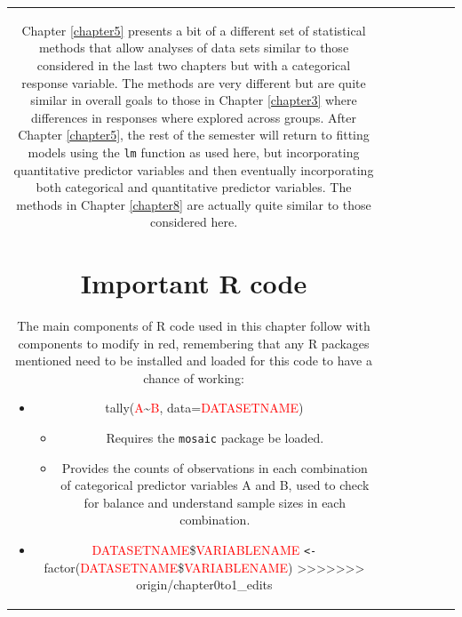 \documentclass[]{book}
\newenvironment{Shaded}{\begin{snugshade}}{\end{snugshade}}
\theoremstyle{definition}
\theoremstyle{definition}
\theoremstyle{remark}
\begin{document}
\begin{longtable}[]{@{}ccccccc@{}}
\begin{minipage}[b]{0.10\columnwidth}
\begin{Shaded}
\begin{Highlighting}[]
\begin{Shaded}
\begin{Highlighting}[]
\begin{Shaded}
\begin{Highlighting}[]
\begin{Shaded}
\begin{Highlighting}[]
\begin{Shaded}
\begin{Highlighting}[]
\begin{Shaded}
\begin{Highlighting}[]
\begin{Shaded}
\begin{Highlighting}[]
Chapter \ref{chapter5} presents a bit of a different set of statistical
methods that allow analyses of data sets similar to those considered in
the last two chapters but with a categorical response variable. The
methods are very different but are quite similar in overall goals to
those in Chapter \ref{chapter3} where differences in responses where
explored across groups. After Chapter \ref{chapter5}, the rest of the
semester will return to fitting models using the \texttt{lm} function as
used here, but incorporating quantitative predictor variables and then
eventually incorporating both categorical and quantitative predictor
variables. The methods in Chapter \ref{chapter8} are actually quite
similar to those considered here.

\section{Important R code}\label{section4-8}

The main components of R code used in this chapter follow with
components to modify in red, remembering that any R packages mentioned
need to be installed and loaded for this code to have a chance of
working:

\begin{itemize}
\item
  tally(\textcolor{red}{A}\textasciitilde{}\textcolor{red}{B},
  data=\textcolor{red}{DATASETNAME})

  \begin{itemize}
  \item
    Requires the \texttt{mosaic} package be loaded.
  \item
    Provides the counts of observations in each combination of
    categorical predictor variables A and B, used to check for balance
    and understand sample sizes in each combination.
  \end{itemize}
\item
  \textcolor{red}{DATASETNAME}\$\textcolor{red}{VARIABLENAME}
  \texttt{\textless{}-}
  factor(\textcolor{red}{DATASETNAME}\$\textcolor{red}{VARIABLENAME})
>>>>>>> origin/chapter0to1_edits


\end{itemize}
\end{Highlighting}
\end{Shaded}
\end{Highlighting}
\end{Shaded}
\end{Highlighting}
\end{Shaded}
\end{Highlighting}
\end{Shaded}
\end{Highlighting}
\end{Shaded}
\end{Highlighting}
\end{Shaded}
\end{Highlighting}
\end{Shaded}
\end{minipage}
\end{longtable}
\end{document}
